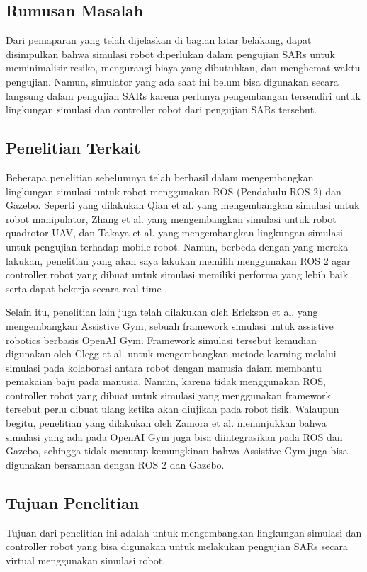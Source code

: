 \subsection{Rumusan Masalah}

Dari pemaparan yang telah dijelaskan di bagian latar belakang, dapat disimpulkan bahwa simulasi robot diperlukan dalam pengujian SARs untuk meminimalisir resiko, mengurangi biaya yang dibutuhkan, dan menghemat waktu pengujian.
Namun, simulator yang ada saat ini belum bisa digunakan secara langsung dalam pengujian SARs karena perlunya pengembangan tersendiri untuk lingkungan simulasi dan controller robot dari pengujian SARs tersebut.

\subsection{Penelitian Terkait}

Beberapa penelitian sebelumnya telah berhasil dalam mengembangkan lingkungan simulasi untuk robot menggunakan ROS (Pendahulu ROS 2) dan Gazebo.
Seperti yang dilakukan Qian et al. \citep{Qian2014} yang mengembangkan simulasi untuk robot manipulator, Zhang et al. \citep{Zhang2015} yang mengembangkan simulasi untuk robot quadrotor UAV, dan Takaya et al. \citep{Takaya2016} yang mengembangkan lingkungan simulasi untuk pengujian terhadap mobile robot.
Namun, berbeda dengan yang mereka lakukan, penelitian yang akan saya lakukan memilih menggunakan ROS 2 agar controller robot yang dibuat untuk simulasi memiliki performa yang lebih baik serta dapat bekerja secara real-time \citep{Maruyama2016}.

Selain itu, penelitian lain juga telah dilakukan oleh Erickson et al. \citep{Erickson2020} yang mengembangkan Assistive Gym, sebuah framework simulasi untuk assistive robotics berbasis OpenAI Gym.
Framework simulasi tersebut kemudian digunakan oleh Clegg et al. \citep{Clegg2020} untuk mengembangkan metode learning melalui simulasi pada kolaborasi antara robot dengan manusia dalam membantu pemakaian baju pada manusia.
Namun, karena tidak menggunakan ROS, controller robot yang dibuat untuk simulasi yang menggunakan framework tersebut perlu dibuat ulang ketika akan diujikan pada robot fisik.
Walaupun begitu, penelitian yang dilakukan oleh Zamora et al. \citep{Zamora2016} menunjukkan bahwa simulasi yang ada pada OpenAI Gym juga bisa diintegrasikan pada ROS dan Gazebo, sehingga tidak menutup kemungkinan bahwa Assistive Gym juga bisa digunakan bersamaan dengan ROS 2 dan Gazebo.

\subsection{Tujuan Penelitian}

Tujuan dari penelitian ini adalah untuk mengembangkan lingkungan simulasi dan controller robot yang bisa digunakan untuk melakukan pengujian SARs secara virtual menggunakan simulasi robot.
